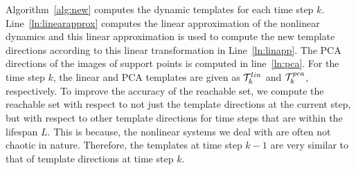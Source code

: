 

Algorithm~\ref{alg:new} computes the dynamic templates for each time step $k$.
%
Line~\ref{ln:linearapprox} computes the linear approximation of the nonlinear dynamics and this linear approximation is used to compute the new template directions according to this linear transformation in Line~\ref{ln:linapp}.
%
The PCA directions of the images of support points is computed in line~\ref{ln:pca}.
%
For the time step $k$, the linear and PCA templates are given as ${\cal T}_{k}^{lin}$ and ${\cal T}_{k}^{pca}$, respectively.
%
To improve the accuracy of the reachable set, we compute the reachable set with respect to not just the template directions at the current step, but with respect to other template directions for time steps that are within the lifespan $L$.
%
This is because, the nonlinear systems we deal with are often not chaotic in nature.
%
Therefore, the templates at time step $k-1$ are very similar to that of template directions at time step $k$.
%
